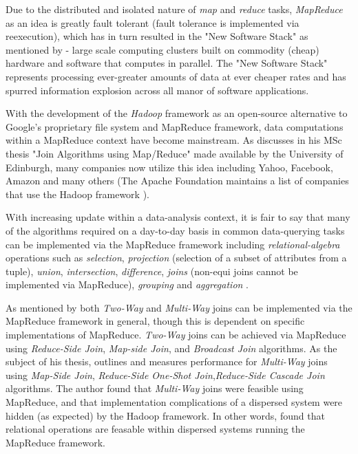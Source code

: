 Due to the distributed and isolated nature of \textit{map} and \textit{reduce} tasks, \textit{MapReduce} as an idea is greatly fault tolerant (fault tolerance is implemented via reexecution), which has in turn resulted in the "New Software Stack" as mentioned by \cite{mining2011} - large scale computing clusters built on commodity (cheap) hardware and software that computes in parallel. The "New Software Stack" represents processing ever-greater amounts of data at ever cheaper rates and has spurred information explosion across all manor of software applications.

With the development of the \textit{Hadoop} framework as an open-source alternative to Google's proprietary file system and MapReduce framework, data computations within a MapReduce context have become mainstream. As \cite{chandar2010} discusses in his MSc thesis "Join Algorithms using Map/Reduce" made available by the University of Edinburgh, many companies now utilize this idea including Yahoo, Facebook, Amazon and many others (The Apache Foundation maintains a list of companies that use the Hadoop framework \cite{hadoopPower:2017}).

With increasing update within a data-analysis context, it is fair to say that many of the algorithms required on a day-to-day basis in common data-querying tasks can be implemented via the MapReduce framework including \textit{relational-algebra} operations such as \textit{selection}, \textit{projection} (selection of a subset of attributes from a tuple), \textit{union}, \textit{intersection}, \textit{difference}, \textit{joins} (non-equi joins cannot be implemented via MapReduce), \textit{grouping} and \textit{aggregation} \cite{mining2011}.

As mentioned by \cite{chandar2010} both \textit{Two-Way} and \textit{Multi-Way} joins can be implemented via the MapReduce framework in general, though this is dependent on specific implementations of MapReduce. \textit{Two-Way} joins can be achieved via MapReduce using \textit{Reduce-Side Join}, \textit{Map-side Join}, and \textit{Broadcast Join} algorithms. As the subject of his thesis, \cite{chandar2010} outlines and measures performance for \textit{Multi-Way} joins using \textit{Map-Side Join}, \textit{Reduce-Side One-Shot Join},\textit{Reduce-Side Cascade Join} algorithms. The author found that \textit{Multi-Way} joins were feasible using MapReduce, and that implementation complications of a dispersed system were hidden (as expected) by the Hadoop framework. In other words, \cite{chandar2010} found that relational operations are feasable within dispersed systems running the MapReduce framework.